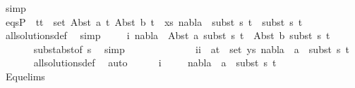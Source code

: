 \begin{isabellebody}
\ simp\isanewline
\isanewline
\ \ \ \isamarkupfalse%
\ {}\isanewline
\ \ \ \isamarkupfalse%
\ eqsP{}{\isacharcolon}{\kern0pt}\ {\isachardoublequoteopen}{\isasymforall}\ {\isacharparenleft}{\kern0pt}t{}{\isacharcomma}{\kern0pt}t{}{\isacharparenright}{\kern0pt}\ {\isasymin}\ set\ {\isacharparenleft}{\kern0pt}{\isacharparenleft}{\kern0pt}Abst\ a\ t{}{\isacharcomma}{\kern0pt}\ Abst\ b\ t{}{\isacharparenright}{\kern0pt}\ {\isacharhash}{\kern0pt}\ xs{\isacharparenright}{\kern0pt}{\isachardot}{\kern0pt}\ nabla{}\ {\isasymturnstile}\ subst\ s{}\ t{}\ {\isasymapprox}\ subst\ s{}\ t{}{\isachardoublequoteclose}\isanewline
\ \ \ \ \ \isamarkupfalse%
\ all{\isacharunderscore}{\kern0pt}solutions{\isacharunderscore}{\kern0pt}def\ \isamarkupfalse%
\ simp\isanewline
\ \ \ \isamarkupfalse%
\ i{\isacharcolon}{\kern0pt}\ {\isachardoublequoteopen}nabla{}\ {\isasymturnstile}\ Abst\ a\ {\isacharparenleft}{\kern0pt}subst\ s{}\ t{}{\isacharparenright}{\kern0pt}\ {\isasymapprox}\ Abst\ b\ {\isacharparenleft}{\kern0pt}subst\ s{}\ t{}{\isacharparenright}{\kern0pt}{\isachardoublequoteclose}\isanewline
\ \ \ \ \ \isamarkupfalse%
\ subst{\isacharunderscore}{\kern0pt}abst{\isacharbrackleft}{\kern0pt}of\ s{}{\isacharbrackright}{\kern0pt}\ \isamarkupfalse%
\ simp\isanewline
\ \ \ \isanewline
\ \ \ \isamarkupfalse%
\ {}\isanewline
\ \ \ \isamarkupfalse%
\ ii{\isacharcolon}{\kern0pt}\ {\isachardoublequoteopen}{\isasymforall}\ {\isacharparenleft}{\kern0pt}a{\isacharcomma}{\kern0pt}t{\isacharparenright}{\kern0pt}\ {\isasymin}\ set\ ys{\isachardot}{\kern0pt}\ nabla{}\ {\isasymturnstile}\ a\ {\isasymsharp}\ subst\ s{}\ t{\isachardoublequoteclose}\isanewline
\ \ \ \ \ \isamarkupfalse%
\ all{\isacharunderscore}{\kern0pt}solutions{\isacharunderscore}{\kern0pt}def\ \isamarkupfalse%
\ auto\isanewline
\ \ \ \isamarkupfalse%
\ {}\ i\isanewline
\ \ \ \isamarkupfalse%
\ {\isachardoublequoteopen}nabla{}\ {\isasymturnstile}\ a\ {\isasymsharp}\ subst\ s{}\ t{}{\isachardoublequoteclose}\isanewline
\ \ \ \ \ \isamarkupfalse%
\ Equ{\isacharunderscore}{\kern0pt}elims{\isacharparenleft}{\kern0pt}{}{\isacharparenright}{\kern0pt}\ \isamarkupfalse%

\end{isabellebody}
